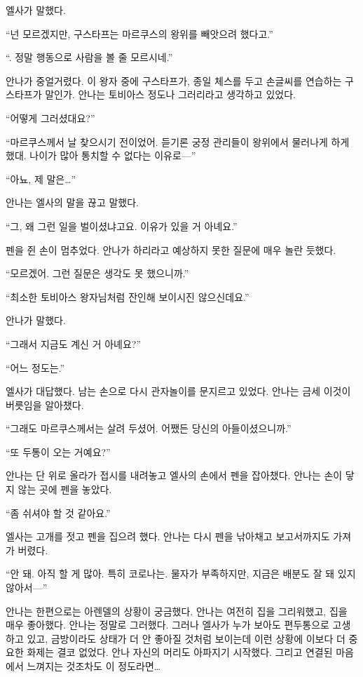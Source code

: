 엘사가 말했다.

``넌 모르겠지만, 구스타프는 마르쿠스의 왕위를 빼앗으려 했다고.''

``. 정말 행동으로 사람을 볼 줄 모르시네.''

안나가 중얼거렸다. 이 왕자 중에 구스타프가, 종일 체스를 두고 손글씨를 연습하는 구스타프가 말인가. 안나는 토비아스 정도나 그러리라고 생각하고 있었다.

``어떻게 그러셨대요?''

``마르쿠스께서 날 찾으시기 전이었어. 듣기론 궁정 관리들이 왕위에서 물러나게 하게 했대. 나이가 많아 통치할 수 없다는 이유로—''

``아뇨, 제 말은\ldots''

안나는 엘사의 말을 끊고 말했다.

``그, 왜 그런 일을 벌이셨냐고요. 이유가 있을 거 아녜요.''

펜을 쥔 손이 멈추었다. 안나가 하리라고 예상하지 못한 질문에 매우 놀란 듯했다.

``모르겠어. 그런 질문은 생각도 못 했으니까.''

``최소한 토비아스 왕자님처럼 잔인해 보이시진 않으신데요.''

안나가 말했다.

``그래서 지금도 계신 거 아녜요?''

``어느 정도는.''

엘사가 대답했다. 남는 손으로 다시 관자놀이를 문지르고 있었다. 안나는 금세 이것이 버릇임을 알아챘다.

``그래도 마르쿠스께서는 살려 두셨어. 어쨌든 당신의 아들이셨으니까.''

``또 두통이 오는 거예요?''

안나는 단 위로 올라가 접시를 내려놓고 엘사의 손에서 펜을 잡아챘다. 안나는 손이 닿지 않는 곳에 펜을 놓았다.

``좀 쉬셔야 할 것 같아요.''

엘사는 고개를 젓고 펜을 집으려 했다. 안나는 다시 펜을 낚아채고 보고서까지도 가져가 버렸다.

``안 돼. 아직 할 게 많아. 특히 코로나는. 물자가 부족하지만, 지금은 배분도 잘 돼 있지 않아서—''

안나는 한편으로는 아렌델의 상황이 궁금했다. 안나는 여전히 집을 그리워했고, 집을 매우 좋아했다. 안나는 정말로 그러했다. 그러나 엘사가 누가 보아도 편두통으로 고생하고 있고, 금방이라도 상태가 더 안 좋아질 것처럼 보이는데 이런 상황에 이보다 더 중요한 화제는 결코 없었다. 안나 자신의 머리도 아파지기 시작했다. 그리고 연결된 마음에서 느껴지는 것조차도 이 정도라면\ldots

